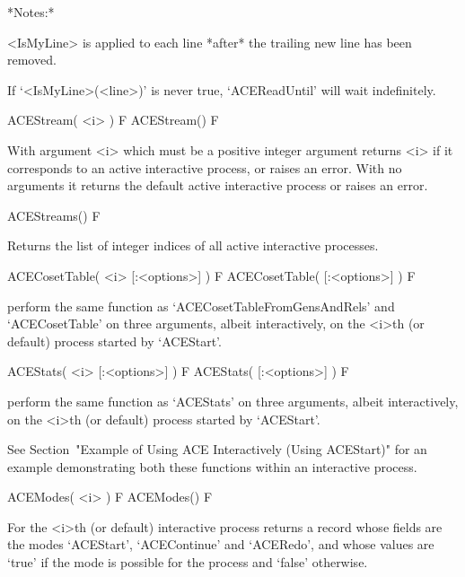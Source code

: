 *Notes:* 

<IsMyLine> is applied to each line *after* the trailing new  line  has
been removed.

If  `<IsMyLine>(<line>)'  is  never  true,  `ACEReadUntil'  will  wait
indefinitely.

\enditems


\beginitems

\>ACEStream( <i> ) F
\>ACEStream() F

With argument <i> which must be a positive  integer  argument  returns
<i> if it corresponds to an active interactive process, or  raises  an
error. With no arguments it returns  the  default  active  interactive
process or raises an error.

\>ACEStreams() F

Returns the list of integer indices of all active  interactive  {\ACE}
processes.

\enditems


\beginitems

\>ACECosetTable( <i> [:<options>] ) F
\>ACECosetTable( [:<options>] ) F

perform  the  same  function  as  `ACECosetTableFromGensAndRels'   and
`ACECosetTable' on three arguments, albeit interactively, on the <i>th
(or default) process started by `ACEStart'.

\>ACEStats( <i> [:<options>] ) F
\>ACEStats( [:<options>] ) F

perform the same function as `ACEStats'  on  three  arguments,  albeit
interactively,  on  the  <i>th  (or  default)   process   started   by
`ACEStart'.

See Section~"Example of Using ACE Interactively (Using ACEStart)"  for
an example demonstrating both these functions  within  an  interactive
process.

\enditems


\beginitems

\>ACEModes( <i> ) F
\>ACEModes() F

For the <i>th (or default) interactive {\ACE} process returns a record
whose fields are the modes `ACEStart',  `ACEContinue'  and  `ACERedo',
and whose values are `true' if the mode is possible  for  the  process
and `false' otherwise.

